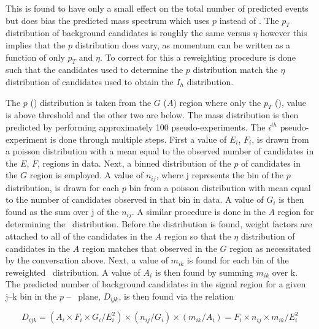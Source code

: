 This is found to have only a small effect on the total number of predicted events but does bias the predicted mass spectrum which uses $p$ instead of \pt.
The $p_T$ distribution of background candidates is roughly the same versus $\eta$ however this implies that the $p$ distribution does vary, as momentum can be written
as a function of only $p_T$ and $\eta$. To correct for this a reweighting procedure is done such that the candidates
used to determine the $p$ distribution match the $\eta$ distribution of candidates used to obtain the $I_h$ distribution.

The $p$ (\ih) distribution
is taken from the $G$ ($A$) region where only the $p_T$  (\ias), value is above threshold and the other two are below. The mass distribution is then predicted by performing
approximately 100 pseudo-experiments. The $i^{th}$ pseudo-experiment is done through multiple steps. First a value of $E_{i}$, $F_i$, is drawn from a poisson
distribution with a mean equal to the observed number of candidates in the $E$, $F$, regions in data.
Next, a binned distribution of the $p$ of candidates in the $G$ region is employed. A value of $n_{ij}$, where j represents the bin of the $p$ distribution, is drawn for
each $p$ bin from a poisson distribution with mean equal to the number of candidates observed in that bin in data. A value of $G_i$ is then found as the sum over j of the
$n_{ij}$. A similar procedure is done in the $A$ region for determining the \ih\ distribution. Before the distribution is found, weight factors are attached to all of
the candidates in the $A$ region so that the $\eta$ distribution of candidates in the $A$ region matches that observed in the $G$ region as necessitated by the conversation
above. Next, a value of $m_{ik}$ is found for each bin of the reweighted \ih\ distribution. A value of $A_i$ is then found by summing $m_{ik}$ over k.
The predicted number of background candidates in the signal region for a given j--k bin in the $p$ -- \dedx\ plane, $D_{ijk}$, is then found via the relation

\begin{equation}
D_{ijk} = (A_i \times F_i \times G_i / E_{i}^{2}) \times (n_{ij}/G_i) \times (m_{ik}/A_i) = F_i \times n_{ij} \times m_{ik} / E_{i}^{2}
\label{eq:MassPrediction}
\end{equation}

